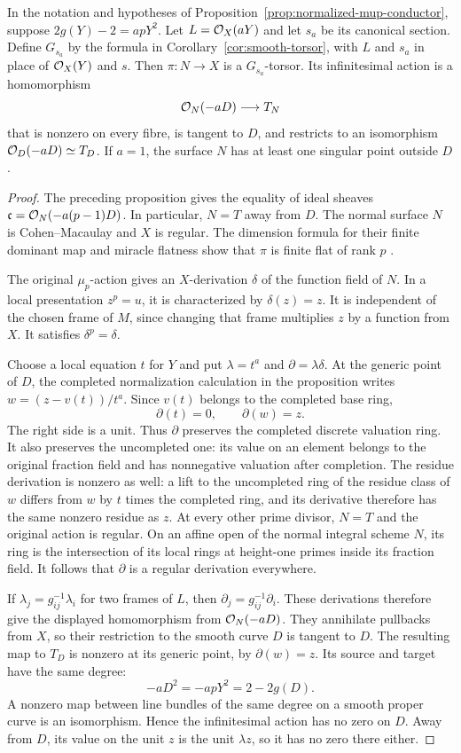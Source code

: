 \begin{corollary}\label{cor:normalized-equality-torsor}
In the notation and hypotheses of
Proposition~\ref{prop:normalized-mup-conductor}, suppose
$2g(Y)-2=apY^2$. Let $L=\mathcal O_X(aY)$ and let $s_a$ be its canonical
section. Define $G_{s_a}$ by the formula in
Corollary~\ref{cor:smooth-torsor}, with $L$ and $s_a$ in place of
$\mathcal O_X(Y)$ and $s$. Then $\pi:N\to X$ is a $G_{s_a}$-torsor.
Its infinitesimal action is a homomorphism
\[
 \mathcal O_N(-aD)\longrightarrow T_N
\]
that is nonzero on every fibre, is tangent to $D$, and restricts to
an isomorphism $\mathcal O_D(-aD)\simeq T_D$.
If $a=1$, the surface $N$ has at least one singular point outside $D$.
\end{corollary}
\begin{proof}
The preceding proposition gives the equality of ideal sheaves
$\mathfrak c=\mathcal O_N(-a(p-1)D)$. In particular, $N=T$ away from $D$.
The normal surface $N$ is Cohen--Macaulay and $X$ is regular.
The dimension formula for their finite dominant map and miracle
flatness show that $\pi$ is finite flat of rank $p$
\cite[Tag 00R4]{Stacks}.

The original $\mu_p$-action gives an $X$-derivation $\delta$ of the
function field of $N$. In a local presentation $z^p=u$, it is
characterized by $\delta(z)=z$. It is independent of the chosen
frame of $M$, since changing that frame multiplies $z$ by a function
from $X$. It satisfies $\delta^p=\delta$.

Choose a local equation $t$ for $Y$ and put $\lambda=t^a$ and
$\partial=\lambda\delta$. At the generic point of $D$, the completed
normalization calculation in the proposition writes
$w=(z-v(t))/t^a$. Since $v(t)$ belongs to the completed base ring,
\[
 \partial(t)=0,\qquad \partial(w)=z.
\]
The right side is a unit. Thus $\partial$ preserves the completed
discrete valuation ring. It also preserves the uncompleted one:
its value on an element belongs to the original fraction field and
has nonnegative valuation after completion. The residue derivation is
nonzero as well: a lift to the uncompleted ring of the residue class of
$w$ differs from $w$ by $t$ times the completed ring, and its derivative
therefore has the same nonzero residue as $z$. At every other prime
divisor, $N=T$ and the original action is regular. On an affine open
of the normal integral scheme $N$, its ring is the intersection of
its local rings at height-one primes inside its fraction field.
It follows that $\partial$ is a regular derivation everywhere.

If $\lambda_j=g_{ij}^{-1}\lambda_i$ for two frames of $L$, then
$\partial_j=g_{ij}^{-1}\partial_i$. These derivations therefore
give the displayed homomorphism from $\mathcal O_N(-aD)$. They annihilate
pullbacks from $X$, so their restriction to the smooth curve $D$
is tangent to $D$. The resulting map to $T_D$ is nonzero at its
generic point, by $\partial(w)=z$. Its source and target have the
same degree:
\[
 -aD^2=-apY^2=2-2g(D).
\]
A nonzero map between line bundles of the same degree on a smooth
proper curve is an isomorphism. Hence the infinitesimal action has
no zero on $D$. Away from $D$, its value on the unit $z$ is the unit
$\lambda z$, so it has no zero there either.


\end{proof}
